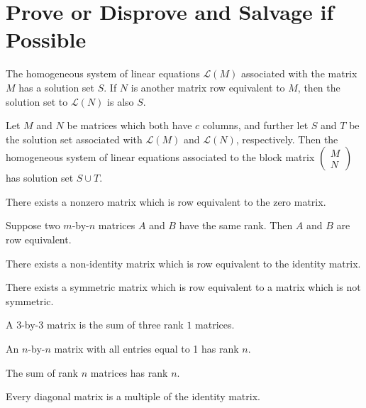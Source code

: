 \documentclass{homework}
\begin{document}
\section{Prove or Disprove and Salvage if Possible}

\begin{problem}
  The homogeneous system of linear equations $\mathcal{L}(M)$
  associated with the matrix $M$ has a solution set $S$.  If $N$ is
  another matrix row equivalent to $M$, then the solution set to
  $\mathcal{L}(N)$ is also $S$.
\end{problem}

\begin{problem}
  Let $M$ and $N$ be matrices which both have $c$ columns, and further
  let $S$ and $T$ be the solution set associated with $\mathcal{L}(M)$
  and $\mathcal{L}(N)$, respectively.  Then the homogeneous system of
  linear equations associated to the block matrix $\begin{pmatrix} M \\
    N \end{pmatrix}$ has solution set $S \cup T$.
\end{problem}

\begin{problem}
  There exists a nonzero matrix which is row equivalent to the zero matrix.
\end{problem}

\begin{problem}
  Suppose two $m$-by-$n$ matrices $A$ and $B$ have the same rank.
  Then $A$ and $B$ are row equivalent.
\end{problem}

\begin{problem}
  There exists a non-identity matrix which is row equivalent to the identity
  matrix.
\end{problem}

\begin{problem}
  There exists a symmetric matrix which is row equivalent to a matrix which
  is not symmetric.
\end{problem}

\begin{problem}
  A $3$-by-$3$ matrix is the sum of three rank $1$ matrices.
\end{problem}

\begin{problem}
  An $n$-by-$n$ matrix with all entries equal to 1 has rank $n$.
\end{problem}

\begin{problem}
  The sum of rank $n$ matrices has rank $n$.
\end{problem}

\begin{problem}
  Every diagonal matrix is a multiple of the identity matrix.
\end{problem}
\end{document}
